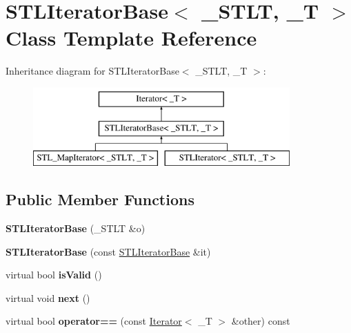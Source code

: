 \hypertarget{class_s_t_l_iterator_base}{
\section{STLIteratorBase$<$ \_\-STLT, \_\-T $>$ Class Template Reference}
\label{class_s_t_l_iterator_base}
}
Inheritance diagram for STLIteratorBase$<$ \_\-STLT, \_\-T $>$:\begin{figure}[H]
\begin{center}
\leavevmode
\includegraphics[height=3cm]{class_s_t_l_iterator_base}
\end{center}
\end{figure}
\subsection*{Public Member Functions}
\begin{DoxyCompactItemize}
\item 
\hypertarget{class_s_t_l_iterator_base_a592d27a25e4045639fd630394de944cd}{
{\bfseries STLIteratorBase} (\_\-STLT \&o)}
\label{class_s_t_l_iterator_base_a592d27a25e4045639fd630394de944cd}

\item 
\hypertarget{class_s_t_l_iterator_base_aa356b45e85f9a4b77f33028968e2cd4b}{
{\bfseries STLIteratorBase} (const \hyperlink{class_s_t_l_iterator_base}{STLIteratorBase} \&it)}
\label{class_s_t_l_iterator_base_aa356b45e85f9a4b77f33028968e2cd4b}

\item 
\hypertarget{class_s_t_l_iterator_base_a677ec17584b36d2bd3d783fef43539e4}{
virtual bool {\bfseries isValid} ()}
\label{class_s_t_l_iterator_base_a677ec17584b36d2bd3d783fef43539e4}

\item 
\hypertarget{class_s_t_l_iterator_base_aa1392a336d0f7658f36ae4edfca60b55}{
virtual void {\bfseries next} ()}
\label{class_s_t_l_iterator_base_aa1392a336d0f7658f36ae4edfca60b55}

\item 
\hypertarget{class_s_t_l_iterator_base_afeaaf5f0f569695ab4aa4f24b02c2aa6}{
virtual bool {\bfseries operator==} (const \hyperlink{class_iterator}{Iterator}$<$ \_\-T $>$ \&other) const }
\label{class_s_t_l_iterator_base_afeaaf5f0f569695ab4aa4f24b02c2aa6}

\end{DoxyCompactItemize}

